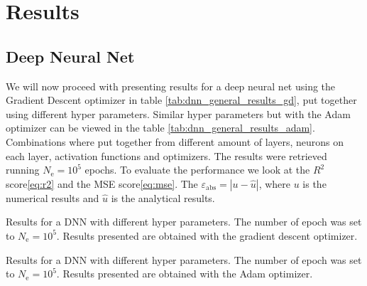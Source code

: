 \section{Results}
\subsection{Deep Neural Net}
We will now proceed with presenting results for a deep neural net using the Gradient Descent optimizer in table \ref{tab:dnn_general_results_gd}, put together using different hyper parameters. Similar hyper parameters but with the Adam optimizer can be viewed in the table \ref{tab:dnn_general_results_adam}. Combinations where put together from different amount of layers, neurons on each layer, activation functions and optimizers. The results were retrieved running $N_\mathrm{e}=10^5$ epochs. To evaluate the performance we look at the $R^2$ score\eqref{eq:r2} and the MSE score\eqref{eq:mse}. The $\varepsilon_{\mathrm{abs}}=|u - \hat{u}|$, where $u$ is the numerical results and $\hat{u}$ is the analytical results.
\begin{table}[h!tb]
    \centering
    \caption{Results for a DNN with different hyper parameters. The number of epoch was set to $N_\mathrm{e}=10^5$. Results presented are obtained with the gradient descent optimizer.}
    \label{tab:dnn_general_results_gd}
\end{table}

\begin{table}[h!tb]
    \centering
    \caption{Results for a DNN with different hyper parameters. The number of epoch was set to $N_\mathrm{e}=10^5$. Results presented are obtained with the Adam optimizer\cite{kingma_adam:_2014}.}
    \label{tab:dnn_general_results_adam}
\end{table}



